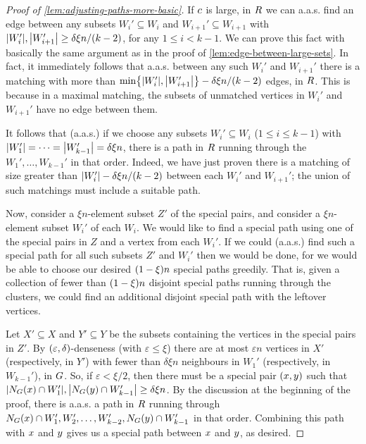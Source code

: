 \documentclass[11pt,english]{article}
\theoremstyle{plain}
\theoremstyle{plain}
\theoremstyle{plain}
\theoremstyle{plain}
\theoremstyle{plain}
\theoremstyle{definition}
\theoremstyle{definition}
\theoremstyle{remark}
\theoremstyle{remark}
\theoremstyle{plain}
\theoremstyle{definition}
\theoremstyle{definition}
\theoremstyle{plain}
\theoremstyle{plain}
\theoremstyle{plain}
\theoremstyle{plain}
\theoremstyle{remark}
\theoremstyle{plain}
\theoremstyle{definition}
\let\originalleft\left
\let\originalright\right
\renewcommand{\left}{\mathopen{}\mathclose\bgroup\originalleft}
\renewcommand{\right}{\aftergroup\egroup\originalright}
\begin{document}
\begin{proof}[Proof of \ref{lem:adjusting-paths-more-basic}]
If $c$ is large, in $R$ we can a.a.s. find an edge between any
subsets $W_{i}'\subseteq W_{i}$ and $W_{i+1}'\subseteq W_{i+1}$
with $\left|W_{i}'\right|,\left|W_{i+1}'\right|\ge\delta\xi n/\left(k-2\right)$,
for any $1\le i<k-1$. We can prove this fact with basically the same
argument as in the proof of \ref{lem:edge-between-large-sets}. In
fact, it immediately follows that a.a.s. between any such $W_{i}'$
and $W_{i+1}'$ there is a matching with more than $\min\left\{ \left|W_{i}'\right|,\left|W_{i+1}'\right|\right\} -\delta\xi n/\left(k-2\right)$
edges, in $R$. This is because in a maximal matching, the subsets
of unmatched vertices in $W_{i}'$ and $W_{i+1}'$ have no edge between
them.

It follows that (a.a.s.) if we choose any subsets $W_{i}'\subseteq W_{i}$
($1\le i\le k-1$) with $\left|W_{1}'\right|=\dots=\left|W_{k-1}'\right|=\delta\xi n$,
there is a path in $R$ running through the $W_{1}',\dots,W_{k-1}'$
in that order. Indeed, we have just proven there is a matching of
size greater than $\left|W_{i}'\right|-\delta\xi n/\left(k-2\right)$
between each $W_{i}'$ and $W_{i+1}'$; the union of such matchings
must include a suitable path.

Now, consider a $\xi n$-element subset $Z'$ of the special pairs,
and consider a $\xi n$-element subset $W_{i}'$ of each $W_{i}$.
We would like to find a special path using one of the special pairs
in $Z$ and a vertex from each $W_{i}'$. If we could (a.a.s.) find
such a special path for all such subsets $Z'$ and $W_{i}'$ then
we would be done, for we would be able to choose our desired $\left(1-\xi\right)n$
special paths greedily. That is, given a collection of fewer than
$\left(1-\xi\right)n$ disjoint special paths running through the
clusters, we could find an additional disjoint special path with the
leftover vertices.

Let $X'\subseteq X$ and $Y'\subseteq Y$ be the subsets containing
the vertices in the special pairs in $Z'$. By $\left(\varepsilon,\delta\right)$-denseness
(with $\varepsilon\le\xi$) there are at most $\varepsilon n$ vertices
in $X'$ (respectively, in $Y'$) with fewer than $\delta\xi n$ neighbours
in $W_{1}'$ (respectively, in $W_{k-1}'$), in $G$. So, if $\varepsilon<\xi/2$,
then there must be a special pair $\left(\x,\y\right)$ such that
$\left|N_{G}\left(\x\right)\cap W_{1}'\right|,\left|N_{G}\left(\y\right)\cap W_{k-1}'\right|\ge\delta\xi n$.
By the discussion at the beginning of the proof, there is a.a.s. a
path in $R$ running through $N_{G}\left(\x\right)\cap W_{1}',W_{2}',\dots,W_{k-2}',N_{G}\left(\y\right)\cap W_{k-1}'$
in that order. Combining this path with $x$ and $y$ gives us a
special path between $x$ and $y$, as desired.
\end{proof}
\end{document}
